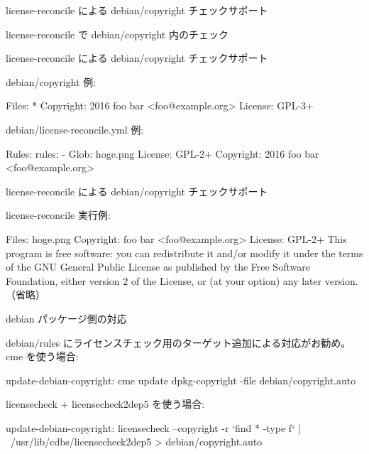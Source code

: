 \begin{frame}[containsverbatim]{license-reconcile による debian/copyright チェックサポート}

license-reconcile で debian/copyright 内のチェック

\end{frame}

\begin{frame}[containsverbatim]{license-reconcile による debian/copyright チェックサポート}

debian/copyright 例:
\begin{center}
\begin{commandline}
Files: *
Copyright: 2016 foo bar <foo@example.org>
License: GPL-3+
\end{commandline}
\end{center}

debian/license-reconcile.yml 例:
\begin{commandline}
Rules:
 rules:
  -
   Glob: hoge.png
   License: GPL-2+
   Copyright: 2016 foo bar <foo@example.org>
\end{commandline}

\end{frame}

\begin{frame}[containsverbatim]{license-reconcile による debian/copyright チェックサポート}

license-reconcile 実行例:


\begin{commandline}
Files: hoge.png
Copyright: foo bar <foo@example.org>
License: GPL-2+
 This program is free software: you can redistribute it and/or modify
 it under the terms of the GNU General Public License as published by
 the Free Software Foundation, either version 2 of the License, or
 (at your option) any later version.
（省略）
\end{commandline}

\end{frame}

\begin{frame}[containsverbatim]{debian パッケージ側の対応}

debian/rules にライセンスチェック用のターゲット追加による対応がお勧め。
\\
cme を使う場合:
\begin{commandlinesmall}
update-debian-copyright:
	cme update dpkg-copyright -file debian/copyright.auto
\end{commandlinesmall}

licensecheck + licensecheck2dep5 を使う場合:
\begin{commandlinesmall}
update-debian-copyright:
        licensecheck --copyright -r `find * -type f` | \
                /usr/lib/cdbs/licensecheck2dep5 > debian/copyright.auto
\end{commandlinesmall}
\end{frame}

